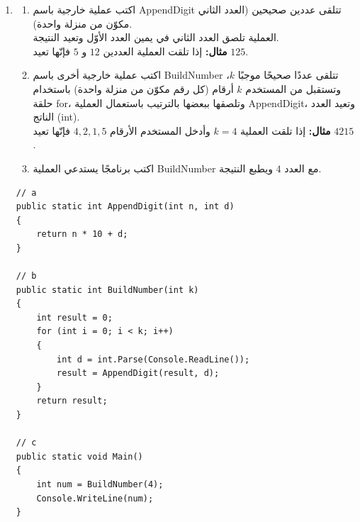 \documentclass[14pt]{extarticle}
\begin{document}
\begin{enumerate}[resume, itemsep=2em]
\begin{boxSolution}
\begin{english}
\begin{verbatim}
// b
public static double Hypotenuse(double a, double b)
{
    double sumSquares = Square(a) + Square(b);
    return Math.Sqrt(sumSquares);
}

// c
public static void Main()
{
    double a = double.Parse(Console.ReadLine());
    double b = double.Parse(Console.ReadLine());
    Console.WriteLine(Hypotenuse(a, b));
}
\end{verbatim}
\end{english}
\end{boxSolution}
\fi
\filbreak

\item
\begin{enumerate}
    \item اكتب عملية خارجية باسم \textenglish{AppendDigit} تتلقى عددين صحيحين (العدد الثاني مكوّن من منزلة واحدة). \\
    العملية تلصق العدد الثاني في يمين العدد الأوّل وتعيد النتيجة. \\
    \textbf{مثال:} إذا تلقت العملية العددين $12$ و $5$ فإنّها تعيد $125$.
    \item اكتب عملية خارجية أخرى باسم \textenglish{BuildNumber} تتلقى عددًا صحيحًا موجبًا $k$، وتستقبل من المستخدم $k$ أرقام (كل رقم مكوّن من منزلة واحدة) باستخدام حلقة \textenglish{for}، وتلصقها ببعضها بالترتيب باستعمال العملية \textenglish{AppendDigit}، وتعيد العدد الناتج (\textenglish{int}). \\
    \textbf{مثال:} إذا تلقت العملية $k = 4$ وأدخل المستخدم الأرقام $4, 2, 1, 5$ فإنّها تعيد $4215$.
    \item اكتب برنامجًا يستدعي العملية \textenglish{BuildNumber} مع العدد $4$ ويطبع النتيجة.
\end{enumerate}
\ifwithsols
\begin{boxSolution}
\begin{english}
\begin{verbatim}
// a
public static int AppendDigit(int n, int d)
{
    return n * 10 + d;
}

// b
public static int BuildNumber(int k)
{
    int result = 0;
    for (int i = 0; i < k; i++)
    {
        int d = int.Parse(Console.ReadLine());
        result = AppendDigit(result, d);
    }
    return result;
}

// c
public static void Main()
{
    int num = BuildNumber(4);
    Console.WriteLine(num);
}
\end{verbatim}
\end{english}
\end{boxSolution}
\fi
\filbreak


\end{enumerate}
\end{document}
